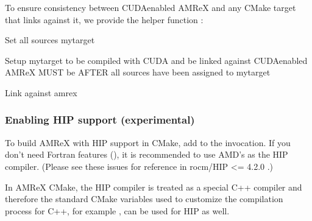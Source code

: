 \documentclass[letterpaper,10pt,english]{sphinxmanual}
\begin{document}
\sphinxAtStartPar
To ensure consistency between CUDA\sphinxhyphen{}enabled AMReX and any CMake target that links against it,
we provide the helper function :

\begin{sphinxVerbatim}[commandchars=\\\{\}]
Set all sources  my\PYGZus{}target

Setup my\PYGZus{}target to be compiled with CUDA and be linked against CUDA\PYGZhy{}enabled AMReX
MUST be  AFTER all sources have been assigned to my\PYGZus{}target

Link against amrex
\end{sphinxVerbatim}


\subsubsection{Enabling HIP support (experimental)}
\label{\detokenize{GPU:enabling-hip-support-experimental}}
\sphinxAtStartPar
To build AMReX with HIP support in CMake, add
to the  invocation.
If you don’t need Fortran features (), it is recommended to use AMD’s  as the HIP compiler.
(Please see these issues for reference in rocm/HIP \textless{}= 4.2.0
.)

\sphinxAtStartPar
In AMReX CMake, the HIP compiler is treated as a special C++ compiler and therefore
the standard CMake variables used to customize the compilation process for C++,
for example , can be used for HIP as well.
\end{document}
